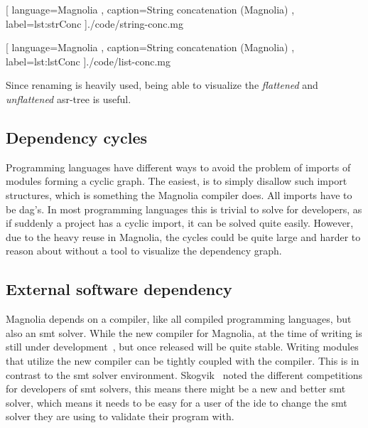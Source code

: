 \begin{center}
  
    [ language=Magnolia
    , caption={String concatenation (Magnolia)}
    , label=lst:strConc
    ]{./code/string-conc.mg}
\end{center}

\begin{center}
  
    [ language=Magnolia
    , caption={String concatenation (Magnolia)}
    , label=lst:lstConc
    ]{./code/list-conc.mg}
\end{center}

Since renaming is heavily used, being able to visualize the \textit{flattened}
and \textit{unflattened} \gls*{asr}-tree is useful.

\subsection{Dependency cycles}

Programming languages have different ways to avoid the problem of imports of
modules forming a cyclic graph. The easiest, is to simply disallow such import
structures, which is something the Magnolia compiler does. All imports have to be
\gls*{dag}'s. In most programming languages this is trivial to solve for
developers, as if suddenly a project has a cyclic import, it can be solved quite
easily. However, due to the heavy reuse in Magnolia, the cycles could be quite
large and harder to reason about without a tool to visualize the dependency graph.

\subsection{External software dependency}

Magnolia depends on a compiler, like all compiled programming languages, but
also an \gls*{smt} solver. While the new compiler for Magnolia, at the time of
writing is still under development~\cite{wiig}, but once released will be quite
stable. Writing modules that utilize the new compiler can be tightly coupled
with the compiler. This is in contrast to the \gls*{smt} solver environment.
Skogvik~\cite{beateVerification} noted the different competitions for developers
of \gls*{smt} solvers, this means there might be a new and better \gls*{smt}
solver, which means it needs to be easy for a user of the \gls*{ide} to change
the \gls*{smt} solver they are using to validate their program with.
